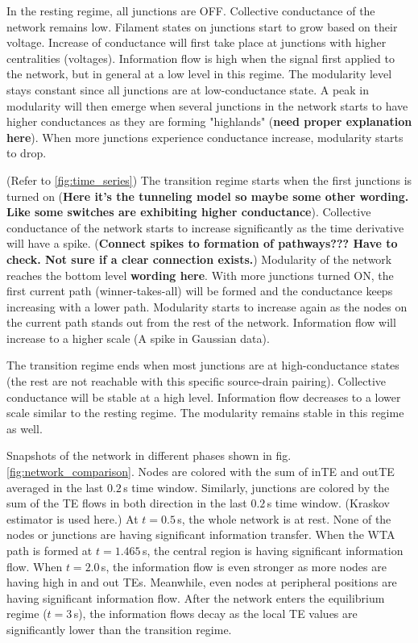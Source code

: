 \documentclass[fleqn,10pt,  reprint, amsmath,amssymb,aps, floatfix]{wlscirep}
\begin{document}
In the resting regime, all junctions are OFF. Collective conductance of the network remains low. Filament states on junctions start to grow based on their voltage. Increase of conductance will first take place at junctions with higher centralities (voltages). Information flow is high when the signal first applied to the network, but in general at a low level in this regime. The modularity level stays constant since all junctions are at low-conductance state. A peak in modularity will then emerge when several junctions in the network starts to have higher conductances as they are forming "highlands" (\textbf{need proper explanation here}). When more junctions experience conductance increase, modularity starts to drop.

(Refer to \ref{fig:time_series}) The transition regime starts when the first junctions is turned on (\textbf{Here it's the tunneling model so maybe some other wording. Like some switches are exhibiting higher conductance}). Collective conductance of the network starts to increase significantly as the time derivative will have a spike. (\textbf{Connect spikes to formation of pathways??? Have to check. Not sure if a clear connection exists.}) Modularity of the network reaches the bottom level \textbf{wording here}. With more junctions turned ON, the first current path (winner-takes-all) will be formed and the conductance keeps increasing with a lower path. Modularity starts to increase again as the nodes on the current path stands out from the rest of the network. Information flow will increase to a higher scale (A spike in Gaussian data). 

The transition regime ends when most junctions are at high-conductance states (the rest are not reachable with this specific source-drain pairing). Collective conductance will be stable at a high level. Information flow decreases to a lower scale similar to the resting regime. The modularity remains stable in this regime as well.

Snapshots of the network in different phases shown in fig. \ref{fig:network_comparison}. Nodes are colored with the sum of inTE and outTE averaged in the last $0.2\,$s time window. Similarly, junctions are colored by the sum of the TE flows in both direction in the last $0.2\,$s time window. (Kraskov estimator is used here.) At $t= 0.5 \,$s, the whole network is at rest. None of the nodes or junctions are having significant information transfer. When the WTA path is formed at $t = 1.465 \,$s, the central region is having significant information flow. When $t = 2.0 \,$s, the information flow is even stronger as more nodes are having high in and out TEs. Meanwhile, even nodes at peripheral positions are having significant information flow. After the network enters the equilibrium regime ($t = 3 \,$s), the information flows decay as the local TE values are significantly lower than the transition regime.
\end{document}
